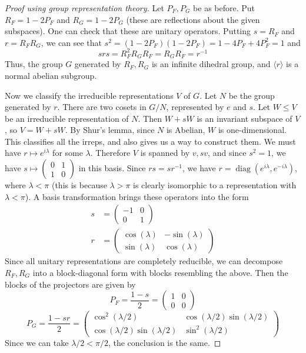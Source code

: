 \documentclass[11pt]{article}
\newcommand{\diag}{\operatorname{diag}}
\begin{document}
\begin{proof}[Proof using group representation theory]
    Let $P_F, P_G$ be as before. Put $R_F = 1 - 2P_F$ and $R_G = 1-2P_G$ (these are reflections about the given subspaces). One can check that these are unitary operators. Putting $s = R_F$ and $r = R_FR_G$, we can see that $s^2 = (1-2P_F)(1-2P_F) = 1-4P_F + 4P_F^2 = 1$ and 
    $$
    srs = R_F^2R_G R_F  = R_GR_F = r^{-1}
    $$
    Thus, the group $G$ generated by $R_F, R_G$ is an infinite dihedral group, and $\langle r \rangle$ is a normal abelian subgroup. 

    Now we classify the irreducible representations $V$ of $G$. Let $N$ be the group generated by $r$. There are two cosets in $G/N$, represented by $e$ and $s$. Let $W \leq V$ be an irreducible representation of $N$. Then $W + sW$ is an invariant subspace of $V$, so $V = W + sW$. By Shur's lemma, since $N$ is Abelian, $W$ is one-dimensional. This classifies all the irreps, and also gives us a way to construct them. We must have $r \mapsto e^{i\lambda}$ for some $\lambda$. Therefore $V$ is spanned by $v, sv$, and since $s^2 = 1$, we have $s \mapsto \begin{pmatrix}0 & 1\\ 1 & 0\end{pmatrix}$ in this basis. Since $rs = sr^{-1}$, we have $r = \diag(e^{i\lambda}, e^{-i\lambda})$, where $\lambda < \pi$ (this is because $\lambda > \pi$ is clearly isomorphic to a representation with $\lambda < \pi$). A basis transformation brings these operators into the form
    \begin{align}
        s &= \begin{pmatrix}-1 & 0 \\ 0 & 1\end{pmatrix} \\
        r &= \begin{pmatrix}\cos(\lambda) & -\sin(\lambda) \\ \sin(\lambda) & \cos(\lambda)\end{pmatrix}
    \end{align}
Since all unitary representations are completely reducible, we can decompose $R_F, R_G$ into a block-diagonal form with blocks resembling the above. Then the blocks of the projectors are given by
$$
    P_F = \frac{1-s}{2} = \begin{pmatrix}1 & 0 \\ 0 & 0\end{pmatrix}
$$
$$
    P_G = \frac{1-sr}{2} = \begin{pmatrix}\cos^{2}(\lambda/2) & \cos(\lambda/2)\sin(\lambda/2) \\ \cos(\lambda/2)\sin(\lambda/2) & \sin^{2}(\lambda/2)\end{pmatrix}
$$
Since we can take $\lambda/2 < \pi/2$, the conclusion is the same.
\end{proof}
\end{document}
